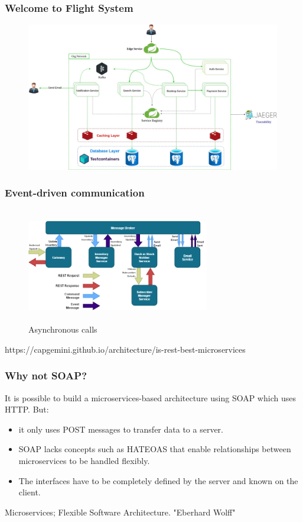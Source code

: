 \documentclass{beamer}
\begin{document}
		
		
	\begin{frame}
		\frametitle{Welcome to Flight System}
		\begin{figure}[h]
				\includegraphics[width=0.99\linewidth, height=65mm, scale=1]{img/Flight-System.png}
		\end{figure}\vspace{1mm}
	\end{frame}	

	\begin{frame}
		\frametitle{Event-driven communication}
			\begin{figure}[h]
				\includegraphics[width=80mm, height=50mm, scale=2]{img/mq-flow.png}
				\caption{Asynchronous calls}
			\end{figure}
		
		\vspace{5mm}
		\tiny {https://capgemini.github.io/architecture/is-rest-best-microservices}
	\end{frame}

	\begin{frame}
		\frametitle{Why not SOAP?}
				It is possible to build a microservices-based architecture using SOAP which uses HTTP. But:
			
			\vspace{5mm}
			\begin{itemize}
				\item
					\scriptsize {it only uses POST messages to transfer data to a server}.
					
				\item 
					\scriptsize{SOAP lacks concepts such as HATEOAS that enable relationships between microservices to be handled flexibly}. 
				\item 
					\scriptsize{The interfaces have to be completely defined by the server and known on the client}.
			\end{itemize}
			
			\vspace{30mm}
			\tiny {Microservices; Flexible Software Architecture. "Eberhard Wolff"}
	\end{frame}
\end{document}
